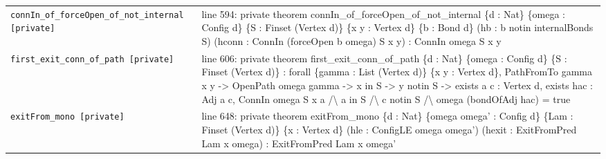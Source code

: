 \documentclass[10pt]{article}
\begin{document}
\begin{longtable}{>{\raggedright\arraybackslash}p{} >{\raggedright\arraybackslash}p{}}
\texttt{connIn\_\allowbreak{}of\_\allowbreak{}forceOpen\_\allowbreak{}of\_\allowbreak{}not\_\allowbreak{}internal [private]} & {\ttfamily\scriptsize line 594:\allowbreak{} private theorem connIn\_\allowbreak{}of\_\allowbreak{}forceOpen\_\allowbreak{}of\_\allowbreak{}not\_\allowbreak{}internal \{d :\allowbreak{} Nat\} \{omega :\allowbreak{} Config d\} \{S :\allowbreak{} Finset (\allowbreak{}Vertex d)\allowbreak{}\} \{x y :\allowbreak{} Vertex d\} \{b :\allowbreak{} Bond d\} (\allowbreak{}hb :\allowbreak{} b notin internalBonds S)\allowbreak{} (\allowbreak{}hconn :\allowbreak{} ConnIn (\allowbreak{}forceOpen b omega)\allowbreak{} S x y)\allowbreak{} :\allowbreak{} ConnIn omega S x y} \\[0.45em]
\texttt{first\_\allowbreak{}exit\_\allowbreak{}conn\_\allowbreak{}of\_\allowbreak{}path [private]} & {\ttfamily\scriptsize line 606:\allowbreak{} private theorem first\_\allowbreak{}exit\_\allowbreak{}conn\_\allowbreak{}of\_\allowbreak{}path \{d :\allowbreak{} Nat\} \{omega :\allowbreak{} Config d\} \{S :\allowbreak{} Finset (\allowbreak{}Vertex d)\allowbreak{}\} :\allowbreak{} forall \{gamma :\allowbreak{} List (\allowbreak{}Vertex d)\allowbreak{}\} \{x y :\allowbreak{} Vertex d\},\allowbreak{} PathFromTo gamma x y -\allowbreak{}> OpenPath omega gamma -\allowbreak{}> x in S -\allowbreak{}> y notin S -\allowbreak{}> exists a c :\allowbreak{} Vertex d,\allowbreak{} exists hac :\allowbreak{} Adj a c,\allowbreak{} ConnIn omega S x a /\allowbreak{}\textbackslash{} a in S /\allowbreak{}\textbackslash{} c notin S /\allowbreak{}\textbackslash{} omega (\allowbreak{}bondOfAdj hac)\allowbreak{} =\allowbreak{} true} \\[0.45em]
\texttt{exitFrom\_\allowbreak{}mono [private]} & {\ttfamily\scriptsize line 648:\allowbreak{} private theorem exitFrom\_\allowbreak{}mono \{d :\allowbreak{} Nat\} \{omega omega' :\allowbreak{} Config d\} \{Lam :\allowbreak{} Finset (\allowbreak{}Vertex d)\allowbreak{}\} \{x :\allowbreak{} Vertex d\} (\allowbreak{}hle :\allowbreak{} ConfigLE omega omega')\allowbreak{} (\allowbreak{}hexit :\allowbreak{} ExitFromPred Lam x omega)\allowbreak{} :\allowbreak{} ExitFromPred Lam x omega'} \\[0.45em]

\end{longtable}
\end{document}
